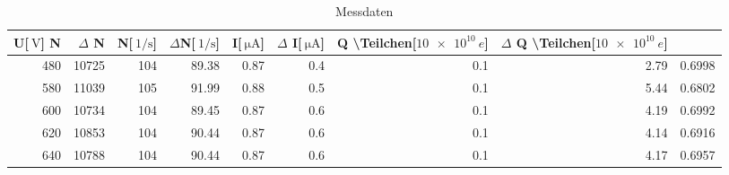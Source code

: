 
\begin{table}[!h]
\begin{center}
\begin{tabular}{|r|r|r|r|r|r|r|r|r|}
\hline
U[$\SI{}{\volt}$] N & $\Delta$ N & N[$\SI{}{1\per\second}$] & $\Delta$N[$\SI{}{1\per\second}$] & I[$\SI{}{\micro\ampere}$] & $\Delta$ I[$\SI{}{\micro\ampere}$] & Q \backslash Teilchen[$\SI{10 e10}{e}$] & $\Delta$ Q \backslash Teilchen[$\SI{10 e10}{e}$] \\
\hline
\hline
480	 &   10725 & 104 & 89.38  & 0.87 &	0.4	& 0.1 & 2.79 & 0.6998\\
580	 &   11039 & 105 & 91.99  & 0.88 &	0.5	& 0.1 & 5.44 & 0.6802\\
600	 &   10734 & 104 & 89.45  & 0.87 &	0.6	& 0.1 & 4.19 & 0.6992\\
620	 &   10853 & 104 & 90.44	& 0.87 &	0.6	& 0.1 & 4.14 & 0.6916\\
640	 &   10788 & 104 & 90.44	& 0.87 &	0.6	& 0.1 & 4.17 & 0.6957
\hline
\end{tabular}
\caption[Aufgabe e]{Messdaten}
\label{tabellee}
\end{center}
\end{table}
